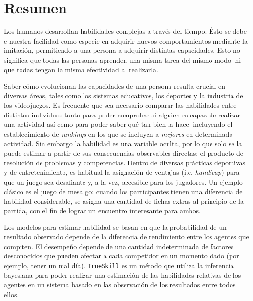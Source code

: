 \documentclass[11pt,twoside, spanish]{report} %
\begin{document}
\chapter*{Resumen}
\pagestyle{empty}
\thispagestyle{empty}

Los humanos desarrollan habilidades complejas a trav\'es del tiempo.
\'Esto se debe e nuestra facilidad como especie en adquirir nuevos comportamientos mediante la imitaci\'on, permitiendo a una persona a adquirir distintas capacidades. %
Esto no significa que todas las personas aprenden una misma tarea del mismo modo, ni que todas tengan la misma efectividad al realizarla.

Saber c\'omo evolucionan las capacidades de una persona resulta crucial en diversas \'areas, tales como los sistemas educativos, los deportes y la industria de los videojuegos.
Es frecuente que sea necesario comparar las habilidades entre distintos individuos tanto para poder comprobar si alguien es capaz de realizar una actividad as\'i como para poder saber qu\'e tan bien la hace, incluyendo el establecimiento de \emph{rankings} en los que se incluyen a \emph{mejores} en determinada actividad.
Sin embargo la habilidad es una variable oculta, por lo que solo se la puede estimar a partir de sus consecuencias observables directas: el producto de resoluci\'on de problemas y competencias.
Dentro de diversas pr\'acticas deportivas y de entretenimiento, es habitual la asignaci\'on de ventajas (i.e. \emph{handicap}) para que un juego sea desafiante y, a la vez, accesible para los jugadores.
Un ejemplo cl\'asico es el juego de mesa go: cuando los participantes tienen una diferencia de habilidad considerable, se asigna una cantidad de fichas extras al principio de la partida, con el fin de lograr un encuentro interesante para ambos.

Los modelos para estimar habilidad se basan en que la probabilidad de un resultado observado depende de la diferencia de rendimiento entre los agentes que compiten.
El desempe\~no depende de una cantidad indeterminada de factores desconocidos que pueden afectar a cada competidor en un momento dado (por ejemplo, tener un mal d\'ia).
\texttt{TrueSkill} es un m\'etodo que utiliza la inferencia bayesiana para poder realizar una estimaci\'on de las habilidades relativas de los agentes en un sistema basado en las observaci\'on de los resultados entre todos ellos.
\end{document}
